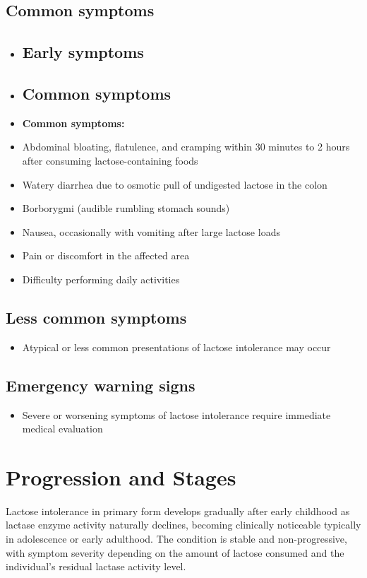 \subsection{Common symptoms}
\begin{itemize}[noitemsep]
  \item \subsection{Early symptoms}
  \item \subsection{Common symptoms}
  \item \textbf{Common symptoms:}
  \item Abdominal bloating, flatulence, and cramping within 30 minutes to 2 hours after consuming lactose-containing foods
  \item Watery diarrhea due to osmotic pull of undigested lactose in the colon
  \item Borborygmi (audible rumbling stomach sounds)
  \item Nausea, occasionally with vomiting after large lactose loads
  \item Pain or discomfort in the affected area
  \item Difficulty performing daily activities
\end{itemize}

\subsection{Less common symptoms}
\begin{itemize}[noitemsep]
  \item Atypical or less common presentations of lactose intolerance may occur
\end{itemize}

\subsection{Emergency warning signs}
\begin{itemize}[noitemsep]
  \item Severe or worsening symptoms of lactose intolerance require immediate medical evaluation
\end{itemize}
\section{Progression and Stages}
Lactose intolerance in primary form develops gradually after early childhood as lactase enzyme activity naturally declines, becoming clinically noticeable typically in adolescence or early adulthood. The condition is stable and non-progressive, with symptom severity depending on the amount of lactose consumed and the individual's residual lactase activity level.

